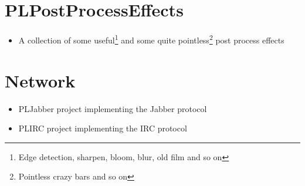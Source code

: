 \section{PLPostProcessEffects}
\begin{itemize}
\item{A collection of some useful\footnote{Edge detection, sharpen, bloom, blur, old film and so on} and some quite pointless\footnote{Pointless crazy bars and so on} post process effects}
\end{itemize}




\section{Network}
\begin{itemize}
\item{PLJabber project implementing the Jabber protocol}
\item{PLIRC project implementing the IRC protocol}
\end{itemize}
